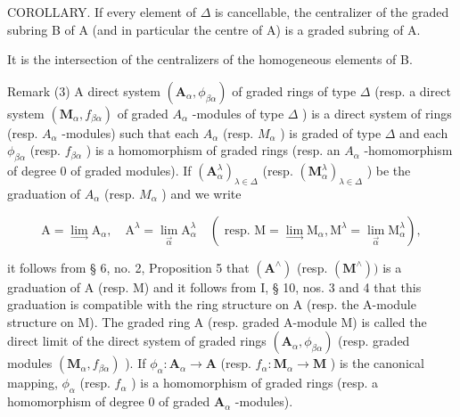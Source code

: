 COROLLARY. If every element of \(\Delta\) is cancellable, the centralizer of the graded subring B of A (and in particular the centre of A) is a graded subring of A.

It is the intersection of the centralizers of the homogeneous elements of B.

Remark (3) A direct system \((\mathbf{A}_{\alpha}, \phi_{\beta\alpha})\) of graded rings of type \(\Delta\) (resp. a direct system \((\mathbf{M}_{\alpha}, f_{\beta\alpha})\) of graded \(A_{\alpha}\) -modules of type \(\Delta\) ) is a direct system of rings (resp. \(A_{\alpha}\) -modules) such that each \(A_{\alpha}\) (resp. \(M_{\alpha}\) ) is graded of type \(\Delta\) and each \(\phi_{\beta\alpha}\) (resp. \(f_{\beta\alpha}\) ) is a homomorphism of graded rings (resp. an \(A_{\alpha}\) -homomorphism of degree 0 of graded modules). If \((\mathbf{A}_{\alpha}^{\lambda})_{\lambda \in \Delta}\) (resp. \((\mathbf{M}_{\alpha}^{\lambda})_{\lambda \in \Delta}\) ) be the graduation of \(A_{\alpha}\) (resp. \(M_{\alpha}\) ) and we write

\[
\mathrm{A} = \lim _ {\rightarrow} \mathrm{A} _ {\alpha}, \quad \mathrm{A} ^ {\lambda} = \lim _ {\overrightarrow {\alpha}} \mathrm{A} _ {\alpha} ^ {\lambda} \quad (\text { resp.   } \mathrm{M} = \lim _ {\rightarrow} \mathrm{M} _ {\alpha}, \mathrm{M} ^ {\lambda} = \lim _ {\overrightarrow {\alpha}} \mathrm{M} _ {\alpha} ^ {\lambda}),
\]

it follows from § 6, no. 2, Proposition 5 that \((\mathbf{A}^{\wedge})\) (resp. \((\mathbf{M}^{\wedge}))\) is a graduation of A (resp. M) and it follows from I, § 10, nos. 3 and 4 that this graduation is compatible with the ring structure on A (resp. the A-module structure on M). The graded ring A (resp. graded A-module M) is called the direct limit of the direct system of graded rings \((\mathbf{A}_{\alpha}, \phi_{\beta \alpha})\) (resp. graded modules \((\mathbf{M}_{\alpha}, f_{\beta \alpha})\) ). If \(\phi_{\alpha} \colon \mathbf{A}_{\alpha} \to \mathbf{A}\) (resp. \(f_{\alpha} \colon \mathbf{M}_{\alpha} \to \mathbf{M}\) ) is the canonical mapping, \(\phi_{\alpha}\) (resp. \(f_{\alpha}\) ) is a homomorphism of graded rings (resp. a homomorphism of degree 0 of graded \(\mathbf{A}_{\alpha}\) -modules).

